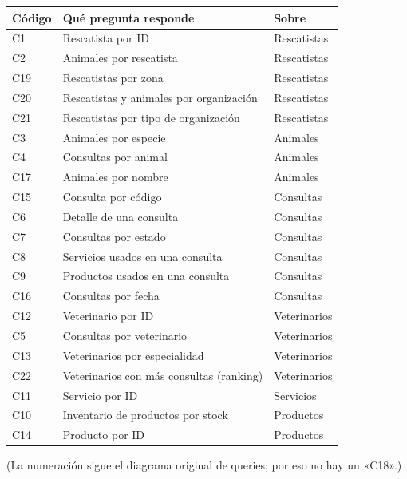 \documentclass[11pt,a4paper]{article}
\begin{document}
\smallskip
\begin{center}\small
\begin{tabular}{@{}l p{} l@{}}
\toprule
\textbf{Código} & \textbf{Qué pregunta responde} & \textbf{Sobre} \\
\midrule
C1  & Rescatista por ID                          & Rescatistas \\
C2  & Animales por rescatista                     & Rescatistas \\
C19 & Rescatistas por zona                        & Rescatistas \\
C20 & Rescatistas y animales por organización     & Rescatistas \\
C21 & Rescatistas por tipo de organización        & Rescatistas \\
\addlinespace
C3  & Animales por especie                        & Animales \\
C4  & Consultas por animal                        & Animales \\
C17 & Animales por nombre                         & Animales \\
\addlinespace
C15 & Consulta por código                         & Consultas \\
C6  & Detalle de una consulta                     & Consultas \\
C7  & Consultas por estado                        & Consultas \\
C8  & Servicios usados en una consulta            & Consultas \\
C9  & Productos usados en una consulta            & Consultas \\
C16 & Consultas por fecha                         & Consultas \\
\addlinespace
C12 & Veterinario por ID                          & Veterinarios \\
C5  & Consultas por veterinario                   & Veterinarios \\
C13 & Veterinarios por especialidad               & Veterinarios \\
C22 & Veterinarios con más consultas (ranking)    & Veterinarios \\
\addlinespace
C11 & Servicio por ID                             & Servicios \\
C10 & Inventario de productos por stock           & Productos \\
C14 & Producto por ID                             & Productos \\
\bottomrule
\end{tabular}
\end{center}
\smallskip
\noindent\footnotesize (La numeración sigue el diagrama original de queries; por eso no
hay un «C18».)\normalsize
\end{document}
